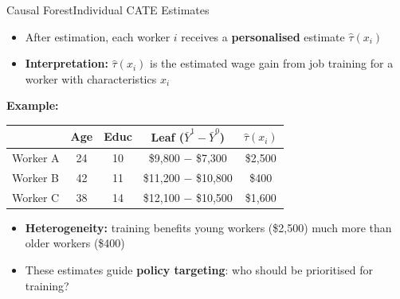 \documentclass[dvipsnames,hyperref={pdfpagelabels=false}]{beamer}
\begin{document}
\begin{frame}{Causal Forest}{Individual CATE Estimates}
\begin{itemize}
	\item After estimation, each worker $i$ receives a \textbf{personalised} estimate $\hat{\tau}(x_i)$
	\vspace{0.2cm}
	\item \textbf{Interpretation:} $\hat{\tau}(x_i)$ is the estimated wage gain from job training for a worker with characteristics $x_i$
\end{itemize}
\vspace{0.2cm}
\textbf{Example:}
\vspace{0.1cm}
\begin{center}
\small
\begin{tabular}{lcccc}
	\hline
	& Age & Educ & Leaf ($\bar{Y}^1 - \bar{Y}^0$) & $\hat{\tau}(x_i)$ \\
	\hline
	Worker A & 24 & 10 & \$9,800 $-$ \$7,300 & \$2,500 \\
	Worker B & 42 & 11 & \$11,200 $-$ \$10,800 & \$400 \\
	Worker C & 38 & 14 & \$12,100 $-$ \$10,500 & \$1,600 \\
	\hline
\end{tabular}
\end{center}
\vspace{0.2cm}
\begin{itemize}
	\item \textbf{Heterogeneity:} training benefits young workers (\$2,500) much more than older workers (\$400)
	\vspace{0.1cm}
	\item These estimates guide \textbf{policy targeting}: who should be prioritised for training?
\end{itemize}
\end{frame}
\end{document}
